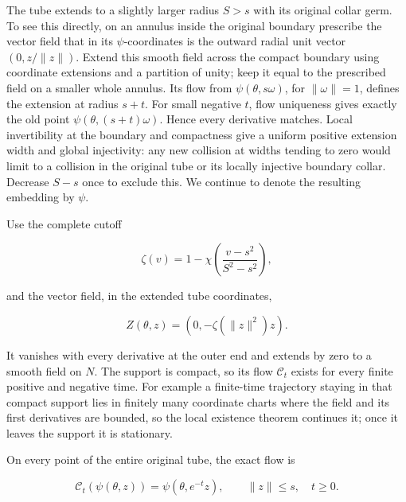The tube extends to a slightly larger radius \(S>s\) with its original collar germ. To see this directly, on an annulus inside the original boundary prescribe the vector field that in its \(\psi\)-coordinates is the outward radial unit vector \((0,z/\|z\|)\). Extend this smooth field across the compact boundary using coordinate extensions and a partition of unity; keep it equal to the prescribed field on a smaller whole annulus. Its flow from \(\psi(\theta,s\omega)\), for \(\|\omega\|=1\), defines the extension at radius \(s+t\). For small negative \(t\), flow uniqueness gives exactly the old point \(\psi(\theta,(s+t)\omega)\). Hence every derivative matches. Local invertibility at the boundary and compactness give a uniform positive extension width and global injectivity: any new collision at widths tending to zero would limit to a collision in the original tube or its locally injective boundary collar. Decrease \(S-s\) once to exclude this. We continue to denote the resulting embedding by \(\psi\).

Use the complete cutoff

\begin{equation}
\zeta(v)=1-\chi\left(\frac{v-s^2}{S^2-s^2}\right),
\label{courseIII:rearranging-the-original-framed-handles:eq:2.2}
\end{equation}

and the vector field, in the extended tube coordinates,

\begin{equation}
Z(\theta,z)=(0,-\zeta(\|z\|^2)z).
\label{courseIII:rearranging-the-original-framed-handles:eq:2.3}
\end{equation}

It vanishes with every derivative at the outer end and extends by zero to a smooth field on \(N\). The support is compact, so its flow \(\mathcal C_t\) exists for every finite positive and negative time. For example a finite-time trajectory staying in that compact support lies in finitely many coordinate charts where the field and its first derivatives are bounded, so the local existence theorem continues it; once it leaves the support it is stationary.

On every point of the entire original tube, the exact flow is

\begin{equation}
\mathcal C_t(\psi(\theta,z))
=\psi(\theta,e^{-t}z),\qquad \|z\|\leq s,\quad t\geq0.
\label{courseIII:rearranging-the-original-framed-handles:eq:2.4}
\end{equation}

